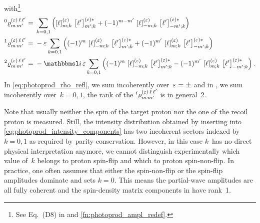with\footnote{See Eq.~(D8) in  and
\cref{fn:photoprod_ampl_redef}.}
\begin{align}
  \label{eq:photoprod_rho_0_refl}
  \prescript{0}{}{\varrho}^{(\refl)\, \ell\, \ell'}_{m\, m'}
  ={}& \sum_{k = 0, 1} \rBrk[2]{\sBrk{\ell}^{(\refl)}_{m; k}\, \sBrk{\ell'}^{(\refl) *}_{m'; k}
  + (-1)^{m - m'}\, \sBrk{\ell}^{(\refl)}_{{-m}; k}\, \sBrk{\ell'}^{(\refl) *}_{{-m'}; k}}
  \\
  \label{eq:photoprod_rho_1_refl}
  \prescript{1}{}{\varrho}^{(\refl)\, \ell\, \ell'}_{m\, m'}
  ={}& -\refl \sum_{k = 0, 1}
  \rBrk[2]{(-1)^m\, \sBrk{\ell}^{(\refl)}_{{-m}; k}\, \sBrk{\ell'}^{(\refl) *}_{m'; k}
  + (-1)^{m'}\, \sBrk{\ell}^{(\refl)}_{m; k}\, \sBrk{\ell'}^{(\refl) *}_{{-m'}; k}}
  \\
  \label{eq:photoprod_rho_2_refl}
  \prescript{2}{}{\varrho}^{(\refl)\, \ell\, \ell'}_{m\, m'}
  ={}& -\imag\, \refl \sum_{k = 0, 1}
  \rBrk[2]{(-1)^m\, \sBrk{\ell}^{(\refl)}_{{-m}; k}\, \sBrk{\ell'}^{(\refl) *}_{m'; k}
  - (-1)^{m'}\, \sBrk{\ell}^{(\refl)}_{m; k}\, \sBrk{\ell'}^{(\refl) *}_{{-m'}; k}}.
\end{align}
In \cref{eq:photoprod_rho_refl}, we sum incoherently over~$\varepsilon =
\pm$ and in
, we sum
incoherently over~$k = 0, 1$, \ie the rank of the
$\prescript{i}{}{\varrho}^{(\varepsilon)\, \ell\, \ell'}_{m\, m'}$ is in
general~2.

Note that usually neither the spin of the target proton nor the one of
the recoil proton is measured.  Still, the intensity distribution
obtained by inserting
 into
\cref{eq:photoprod_intensity_components} has two incoherent sectors
indexed by~$k = 0, 1$ as required by parity conservation.  However, in
this case $k$~has no direct physical interpretation anymore, \ie we
cannot distinguish experimentally which value of~$k$ belongs to proton
spin-flip and which to proton spin-non-flip.  In practice, one often
assumes that either the spin-non-flip or the spin-flip amplitudes
dominate and sets $k = 0$.  This means the partial-wave amplitudes are
all fully coherent and the spin-density matrix components in
 have
rank~1.


